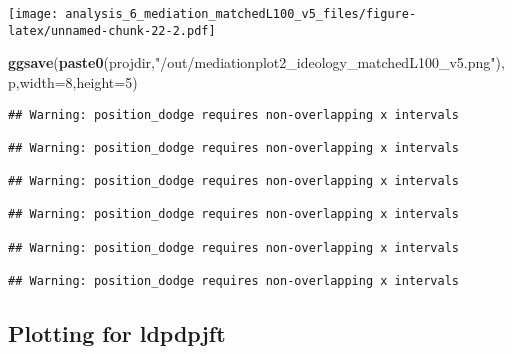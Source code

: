 \documentclass[
]{article}
\newenvironment{Shaded}{\begin{snugshade}}{\end{snugshade}}
\newcommand{\DataTypeTok}[1]{\textcolor[rgb]{0.13,0.29,0.53}{#1}}
\newcommand{\DecValTok}[1]{\textcolor[rgb]{0.00,0.00,0.81}{#1}}
\newcommand{\KeywordTok}[1]{\textcolor[rgb]{0.13,0.29,0.53}{\textbf{#1}}}
\newcommand{\NormalTok}[1]{#1}
\newcommand{\StringTok}[1]{\textcolor[rgb]{0.31,0.60,0.02}{#1}}
\begin{document}
\texttt{[image: analysis\_6\_mediation\_matchedL100\_v5\_files/figure-latex/unnamed-chunk-22-2.pdf]}

\begin{Shaded}
\begin{Highlighting}[]
\KeywordTok{ggsave}\NormalTok{(}\KeywordTok{paste0}\NormalTok{(projdir,}\StringTok{"/out/mediationplot2_ideology_matchedL100_v5.png"}\NormalTok{),p,}\DataTypeTok{width=}\DecValTok{8}\NormalTok{,}\DataTypeTok{height=}\DecValTok{5}\NormalTok{)}
\end{Highlighting}
\end{Shaded}

\begin{verbatim}
## Warning: position_dodge requires non-overlapping x intervals

## Warning: position_dodge requires non-overlapping x intervals

## Warning: position_dodge requires non-overlapping x intervals

## Warning: position_dodge requires non-overlapping x intervals

## Warning: position_dodge requires non-overlapping x intervals

## Warning: position_dodge requires non-overlapping x intervals
\end{verbatim}

\hypertarget{plotting-for-ldpdpjft}{%
\subsection{Plotting for ldpdpjft}\label{plotting-for-ldpdpjft}}
\end{document}
